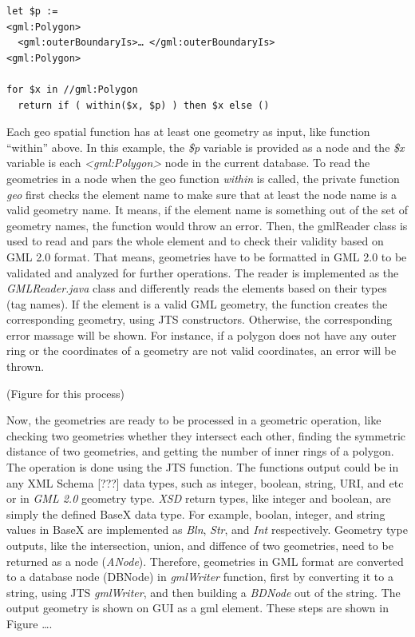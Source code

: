 \documentclass[a4paper,12pt]{article}
\begin{document}
\begin{verbatim}
let $p := 
<gml:Polygon>
  <gml:outerBoundaryIs>… </gml:outerBoundaryIs>
<gml:Polygon>
	
for $x in //gml:Polygon
  return if ( within($x, $p) ) then $x else ()
\end{verbatim}

Each geo spatial function has at least one geometry as input, like function “within” above. In this example, the \textit{\$p} variable is provided as a node and the \textit{\$x} variable is each \textit{<gml:Polygon>} node in the current database. To read the geometries in a node when the geo function \textit{within} is called, the private function \textit{geo} first checks the element name to make sure that at least the node name is a valid geometry name. It means, if the element name is something out of the set of geometry names, the function would throw an error. 
Then, the gmlReader class is used to read and pars the whole element and to check their validity based on GML 2.0 format. That means, geometries have to be formatted in GML 2.0 to be validated and analyzed for further operations. The reader is implemented as the \textit{GMLReader.java} class and differently reads the elements based on their types (tag names). If the element is a valid GML geometry, the function creates the corresponding geometry, using JTS constructors. Otherwise, the corresponding error massage will be shown. For instance, if a polygon does not have any outer ring or the coordinates of a geometry are not valid coordinates, an error will be thrown. 

(Figure for this process)

Now, the geometries are ready to be processed in a geometric operation, like checking two geometries whether they intersect each other, finding the symmetric distance of two geometries, and getting the number of inner rings of a polygon. The operation is done using the JTS function. The functions output could be in any XML Schema [???] data types, such as integer, boolean, string, URI, and etc or in \textit{GML 2.0} geometry type. \textit{XSD} return types, like integer and boolean, are simply the defined BaseX data type. For example, boolan, integer, and string values in BaseX are implemented as \textit{Bln}, \textit{Str}, and \textit{Int} respectively. Geometry type outputs, like the intersection, union, and diffence of two geometries, need to be returned as a node (\textit{ANode}). Therefore, geometries in GML format are converted to a database node (DBNode) in \textit{gmlWriter} function, first by converting it to a string, using JTS \textit{gmlWriter}, and then building a \textit{BDNode} out of the string. The output geometry is shown on GUI as a gml element. These steps are shown in Figure ….
\end{document}
